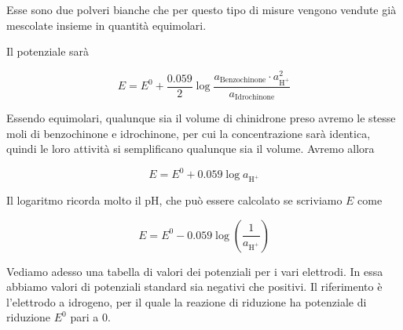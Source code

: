 Esse sono due polveri bianche che per questo tipo di misure vengono vendute già mescolate insieme in quantità equimolari.

Il potenziale sarà

$$E = E^0 + \frac{0.059}{2} \log \frac{a_{\text{Benzochinone}} \cdot a^2_{\text{H}^+}}{a_{\text{Idrochinone}}}$$

Essendo equimolari, qualunque sia il volume di chinidrone preso avremo le stesse moli di benzochinone e idrochinone, per cui la concentrazione sarà identica, quindi le loro attività si semplificano qualunque sia il volume. Avremo allora

$$E = E^0 + 0.059 \log a_{\text{H}^+}$$

Il logaritmo ricorda molto il pH, che può essere calcolato se scriviamo $E$ come

$$E = E^0 - 0.059 \log \left( \frac{1}{a_{\text{H}^+}} \right)$$

\vspace{1cm}Vediamo adesso una tabella di valori dei potenziali per i vari elettrodi. In essa abbiamo valori di potenziali standard sia negativi che positivi. Il riferimento è l'elettrodo a idrogeno, per il quale la reazione di riduzione ha potenziale di riduzione $E^0$ pari a 0. 
\newpage

